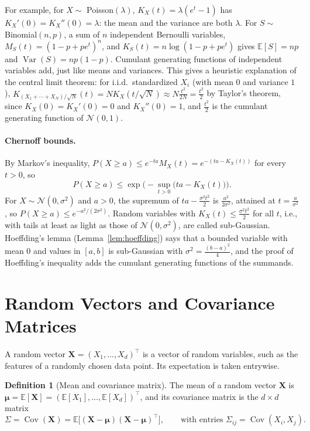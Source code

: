 \documentclass[11pt]{article}
\newcommand{\E}{\mathbb{E}}
\DeclareMathOperator{\Var}{Var}
\DeclareMathOperator{\Cov}{Cov}
\theoremstyle{definition}
\newtheorem{definition}{Definition}[section]
\theoremstyle{plain}
\theoremstyle{remark}
\begin{document}
For example, for $X \sim$ Poisson$(\lambda)$, $K_X(t) = \lambda(e^t - 1)$ has $K_X'(0) = K_X''(0) = \lambda$: the mean and the variance are both $\lambda$. For $S \sim$ Binomial$(n, p)$, a sum of $n$ independent Bernoulli variables, $M_S(t) = (1 - p + pe^t)^n$, and $K_S(t) = n\log(1 - p + pe^t)$ gives $\E[S] = np$ and $\Var(S) = np(1 - p)$. Cumulant generating functions of independent variables add, just like means and variances. This gives a heuristic explanation of the central limit theorem: for i.i.d.\ standardized $X_i$ (with mean $0$ and variance $1$), $K_{(X_1 + \cdots + X_N)/\sqrt{N}}(t) = NK_X(t/\sqrt{N}) \approx N\frac{t^2}{2N} = \frac{t^2}{2}$ by Taylor's theorem, since $K_X(0) = K_X'(0) = 0$ and $K_X''(0) = 1$, and $\frac{t^2}{2}$ is the cumulant generating function of $\mathcal{N}(0, 1)$.

\paragraph{Chernoff bounds.} By Markov's inequality, $P(X \geq a) \leq e^{-ta}M_X(t) = e^{-(ta - K_X(t))}$ for every $t > 0$, so
\[P(X \geq a) \leq \exp\Big(-\sup_{t > 0}\big(ta - K_X(t)\big)\Big).\]
For $X \sim \mathcal{N}(0, \sigma^2)$ and $a > 0$, the supremum of $ta - \frac{\sigma^2t^2}{2}$ is $\frac{a^2}{2\sigma^2}$, attained at $t = \frac{a}{\sigma^2}$, so $P(X \geq a) \leq e^{-a^2/(2\sigma^2)}$. Random variables with $K_X(t) \leq \frac{\sigma^2t^2}{2}$ for all $t$, i.e., with tails at least as light as those of $\mathcal{N}(0, \sigma^2)$, are called sub-Gaussian. Hoeffding's lemma (Lemma~\ref{lem:hoeffding}) says that a bounded variable with mean $0$ and values in $[a, b]$ is sub-Gaussian with $\sigma^2 = \frac{(b - a)^2}{4}$, and the proof of Hoeffding's inequality adds the cumulant generating functions of the summands.

\section{Random Vectors and Covariance Matrices}\label{sec:random-vectors}

A random vector $\mathbf{X} = (X_1, \ldots, X_d)^\top$ is a vector of random variables, such as the features of a randomly chosen data point. Its expectation is taken entrywise.

\begin{definition}[Mean and covariance matrix]\label{def:covariance-matrix}
    The mean of a random vector $\mathbf{X}$ is $\boldsymbol{\mu} = \E[\mathbf{X}] = (\E[X_1], \ldots, \E[X_d])^\top$, and its covariance matrix is the $d \times d$ matrix
    \[\Sigma = \Cov(\mathbf{X}) = \E\big[(\mathbf{X} - \boldsymbol{\mu})(\mathbf{X} - \boldsymbol{\mu})^\top\big], \qquad \text{with entries } \Sigma_{ij} = \Cov(X_i, X_j).\]
\end{definition}
\end{document}
